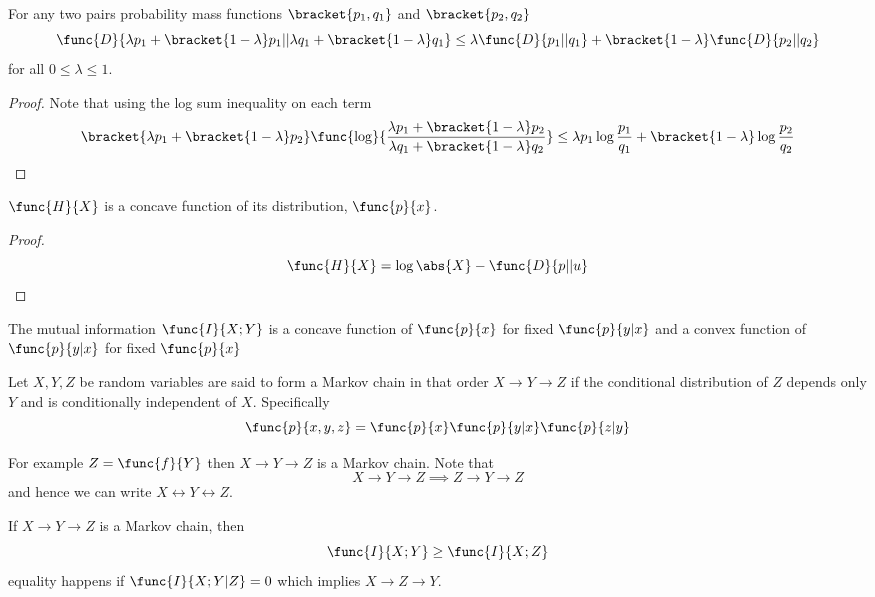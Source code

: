  \begin{theorem}
      For any two pairs probability mass functions \(\bracket{p_1, q_1}\) and \(\bracket{p_2, q_2}\)
      \begin{equation*}
            \func{D}{\lambda p_1 + \bracket{1 - \lambda} p_1 ||\lambda q_1 + \bracket{1 - \lambda} q_1 } \leq \lambda \func{D}{p_1 || q_1} + \bracket{1 - \lambda} \func{D}{p_2 || q_2}
      \end{equation*}
      for all \(0 \leq \lambda \leq 1\).
 \end{theorem}
 \begin{proof}
      Note that using the log sum inequality on each term 
      \begin{equation*}
            \bracket{\lambda p_1 + \bracket{1 - \lambda} p_2} \func{\log}{\frac{\lambda p_1 + \bracket{1 - \lambda} p_2}{\lambda q_1 + \bracket{1 - \lambda} q_2}} \leq \lambda p_1 \log \dfrac{p_1}{q_1} + \bracket{1 - \lambda} \log \dfrac{p_2}{q_2}
      \end{equation*} 
 \end{proof}
 \begin{theorem}
       \(\func{H}{X}\) is a concave function of its distribution, \(\func{p}{x}\).
 \end{theorem}
 \begin{proof}
      \begin{equation*}
            \func{H}{X} = \log \abs{X} - \func{D}{p || u}
      \end{equation*}
 \end{proof}

 \begin{theorem}
      The mutual information \(\func{I}{X;Y}\) is a concave function of \(\func{p}{x}\) for fixed \(\func{p}{y|x}\) and a convex
      function of \(\func{p}{y|x}\) for fixed \(\func{p}{x}\)
 \end{theorem}

 \begin{definition}
       Let \(X,Y,Z\) be random variables are said to form a Markov chain in that order \(X \to Y \to Z\) if the conditional distribution of \(Z\) depends only \(Y\) and is conditionally independent of \(X\). Specifically
       \begin{equation*}
             \func{p}{x,y,z} = \func{p}{x} \func{p}{y|x} \func{p}{z|y}
       \end{equation*}
 \end{definition}
 For example \(Z = \func{f}{Y}\) then \(X \to Y \to Z\) is a Markov chain. Note that 
 \begin{equation*}
       X \to Y \to Z \implies Z \to Y \to Z 
 \end{equation*}
 and hence we can write \(X \leftrightarrow Y \leftrightarrow Z\). 
 \begin{theorem}
       If \(X \to Y \to Z\) is a Markov chain, then
       \begin{equation*}
             \func{I}{X;Y} \geq \func{I}{X;Z}
       \end{equation*}
       equality happens if \(\func{I}{X;Y|Z} = 0\) which implies \(X \to Z \to Y\).
 \end{theorem}

